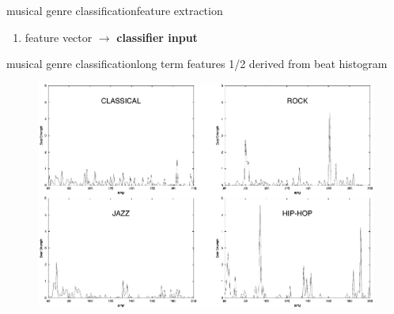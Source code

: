 \begin{frame}{musical genre classification}{feature extraction}
\begin{enumerate}
                \smallskip
                \item<7->	feature vector $\rightarrow$ \textbf{classifier input}
            \end{enumerate}
            \vspace{20mm}
        \end{frame}
        \begin{frame}{musical genre classification}{long term features 1/2}
            derived from beat histogram
            \begin{figure}
                \centering
                \includegraphics[scale=.25]{graph/genre_beat_histogram}
            \end{figure}
        \end{frame}
